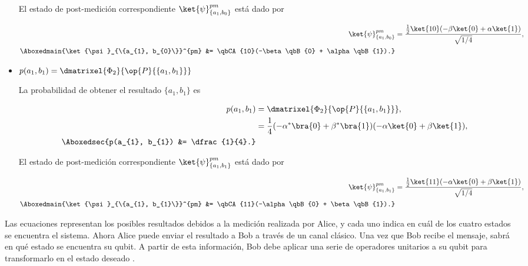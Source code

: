 \documentclass[./../main.tex]{subfiles}
\begin{document}
\begin{itemize}
        El estado de post-medición correspondiente \(\ket{\psi}_{\{a_{1}, b_{0}\}}^{pm}\) está dado por

        \begin{align}
            \ket{\psi}_{\{a_{1}, b_{0}\}}^{pm} &= \dfrac{\tfrac{1}{2}\ket{10}(-\beta\ket{0} + \alpha\ket{1})}{\sqrt{1/4}},\nonumber\\
            \Aboxedmain{\ket{\psi}_{\{a_{1}, b_{0}\}}^{pm} &= \qbCA{10}(-\beta\qbB{0} + \alpha\qbB{1}).}\label{eq:post_measurement-a1-b0}
        \end{align}
        
        \item \(p(a_{1}, b_{1}) = \dmatrixel{\Phi_{2}}{\op{P}{\{a_{1}, b_{1}\}}}\)
        
        La probabilidad de obtener el resultado \(\{a_{1}, b_{1}\}\) es

        \begin{align*}
            p(a_{1}, b_{1}) &= \dmatrixel{\Phi_{2}}{\op{P}{\{a_{1}, b_{1}\}}},\\
            &= \dfrac{1}{4}(-\alphac\bra{0} + \betac\bra{1})(-\alpha\ket{0} + \beta\ket{1}),\\
            \Aboxedsec{p(a_{1}, b_{1}) &= \dfrac{1}{4}.}
        \end{align*}

        El estado de post-medición correspondiente \(\ket{\psi}_{\{a_{1}, b_{1}\}}^{pm}\) está dado por

        \begin{align}
            \ket{\psi}_{\{a_{1}, b_{1}\}}^{pm} &= \dfrac{\tfrac{1}{2}\ket{11}(-\alpha\ket{0} + \beta\ket{1})}{\sqrt{1/4}},\nonumber\\
            \Aboxedmain{\ket{\psi}_{\{a_{1}, b_{1}\}}^{pm} &= \qbCA{11}(-\alpha\qbB{0} + \beta\qbB{1}).}\label{eq:post_measurement-a1-b1}
        \end{align}
    \end{itemize}

    Las ecuaciones  representan los posibles resultados debidos a la medición realizada por Alice, y cada uno indica en cuál de los cuatro estados se encuentra el sistema. Ahora Alice puede enviar el resultado a Bob a través de un canal clásico. Una vez que Bob recibe el mensaje, sabrá en qué estado se encuentra su qubit. A partir de esta información, Bob debe aplicar una serie de operadores unitarios a su qubit para transformarlo en el estado deseado \qbC{\psi}.
\end{document}
